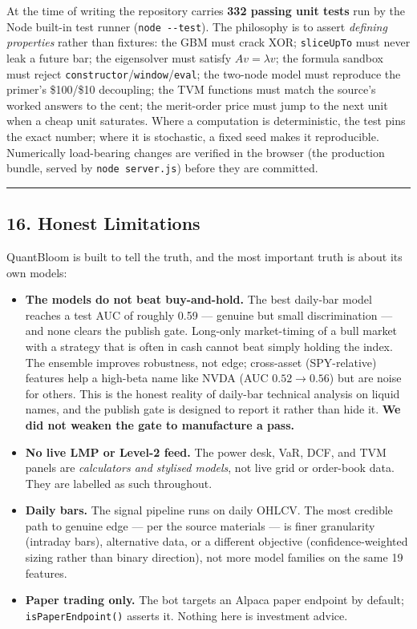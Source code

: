 \documentclass[
  11pt,
]{article}
\newcounter{none} %
\providecommand{\tightlist}{%
  \setlength{\itemsep}{0pt}\setlength{\parskip}{0pt}}
\begin{document}
At the time of writing the repository carries \textbf{332 passing unit
tests} run by the Node built-in test runner (\texttt{node\ -\/-test}).
The philosophy is to assert \emph{defining properties} rather than
fixtures: the GBM must crack XOR; \texttt{sliceUpTo} must never leak a
future bar; the eigensolver must satisfy \(Av=\lambda v\); the formula
sandbox must reject \texttt{constructor}/\texttt{window}/\texttt{eval};
the two-node model must reproduce the primer's \$100/\$10 decoupling;
the TVM functions must match the source's worked answers to the cent;
the merit-order price must jump to the next unit when a cheap unit
saturates. Where a computation is deterministic, the test pins the exact
number; where it is stochastic, a fixed seed makes it reproducible.
Numerically load-bearing changes are verified in the browser (the
production bundle, served by \texttt{node\ server.js}) before they are
committed.

\begin{center}\rule{0.5\linewidth}{0.5pt}\end{center}

\subsection{16. Honest Limitations}\label{honest-limitations}

QuantBloom is built to tell the truth, and the most important truth is
about its own models:

\begin{itemize}
\tightlist
\item
  \textbf{The models do not beat buy-and-hold.} The best daily-bar model
  reaches a test AUC of roughly 0.59 --- genuine but small
  discrimination --- and none clears the publish gate. Long-only
  market-timing of a bull market with a strategy that is often in cash
  cannot beat simply holding the index. The ensemble improves
  robustness, not edge; cross-asset (SPY-relative) features help a
  high-beta name like NVDA (AUC \(0.52 \to 0.56\)) but are noise for
  others. This is the honest reality of daily-bar technical analysis on
  liquid names, and the publish gate is designed to report it rather
  than hide it. \textbf{We did not weaken the gate to manufacture a
  pass.}
\item
  \textbf{No live LMP or Level-2 feed.} The power desk, VaR, DCF, and
  TVM panels are \emph{calculators and stylised models}, not live grid
  or order-book data. They are labelled as such throughout.
\item
  \textbf{Daily bars.} The signal pipeline runs on daily OHLCV. The most
  credible path to genuine edge --- per the source materials --- is
  finer granularity (intraday bars), alternative data, or a different
  objective (confidence-weighted sizing rather than binary direction),
  not more model families on the same 19 features.
\item
  \textbf{Paper trading only.} The bot targets an Alpaca paper endpoint
  by default; \texttt{isPaperEndpoint()} asserts it. Nothing here is
  investment advice.
\end{itemize}
\end{document}
